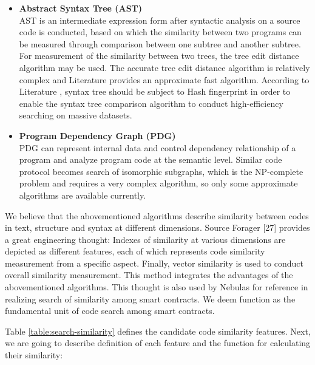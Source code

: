 \begin{itemize}
	\item \textbf{Abstract Syntax Tree (AST)} \\
	AST is an intermediate expression form after syntactic analysis on a source code is conducted, based on which the similarity between two programs can be measured through comparison between one subtree and another subtree. For measurement of the similarity between two trees, the tree edit distance algorithm \cite{zhang1989simple} may be used. The accurate tree edit distance algorithm is relatively complex and Literature \cite{guha2002approximate} provides an approximate fast algorithm. According to Literature \cite{chilowicz2009syntax}, syntax tree should be subject to Hash fingerprint in order to enable the syntax tree comparison algorithm to conduct high-efficiency searching on massive datasets.

	\item \textbf{Program Dependency Graph (PDG)} \\
	PDG \cite{ferrante1987program} can represent internal data and control dependency relationship of a program and analyze program code at the semantic level. Similar code protocol becomes search of isomorphic subgraphs, which is the NP-complete problem and requires a very complex algorithm, so only some approximate algorithms are available currently.

\end{itemize}

We believe that the abovementioned algorithms describe similarity between codes in text, structure and syntax at different dimensions. Source Forager [27] provides a great engineering thought: Indexes of similarity at various dimensions are depicted as different features, each of which represents code similarity measurement from a specific aspect. Finally, vector similarity is used to conduct overall similarity measurement. This method integrates the advantages of the abovementioned algorithms. This thought is also used by Nebulas for reference in realizing search of similarity among smart contracts. We deem function as the fundamental unit of code search among smart contracts.

Table \ref{table:search-similarity} defines the candidate code similarity features. Next, we are going to describe definition of each feature and the function for calculating their similarity:

